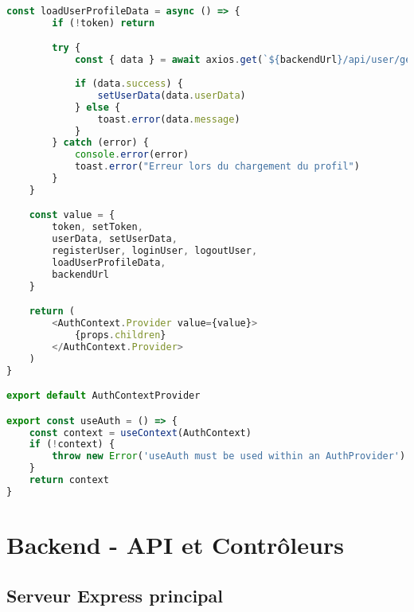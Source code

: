 \begin{lstlisting}[language=JavaScript, caption=AuthContext.jsx - Gestion de l'authentification globale]
    const loadUserProfileData = async () => {
        if (!token) return

        try {
            const { data } = await axios.get(`${backendUrl}/api/user/get-profile`)
            
            if (data.success) {
                setUserData(data.userData)
            } else {
                toast.error(data.message)
            }
        } catch (error) {
            console.error(error)
            toast.error("Erreur lors du chargement du profil")
        }
    }

    const value = {
        token, setToken,
        userData, setUserData,
        registerUser, loginUser, logoutUser,
        loadUserProfileData,
        backendUrl
    }

    return (
        <AuthContext.Provider value={value}>
            {props.children}
        </AuthContext.Provider>
    )
}

export default AuthContextProvider

export const useAuth = () => {
    const context = useContext(AuthContext)
    if (!context) {
        throw new Error('useAuth must be used within an AuthProvider')
    }
    return context
}
\end{lstlisting}

\section{Backend - API et Contrôleurs}

\subsection{Serveur Express principal}


